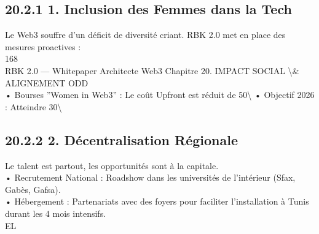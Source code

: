 \subsection{20.2.1 1. Inclusion des Femmes dans la Tech}
Le Web3 souffre d’un déficit de diversité criant. RBK 2.0 met en place des mesures proactives :\\
\vspace{0.5em}
\vspace{0.5em}
168\\
RBK 2.0 — Whitepaper Architecte Web3                                                     Chapitre 20. IMPACT SOCIAL \textbackslash{}& ALIGNEMENT ODD\\
\vspace{0.5em}
\vspace{0.5em}
• Bourses ”Women in Web3” : Le coût Upfront est réduit de 50\textbackslash{}%
\vspace{0.5em}
• Objectif 2026 : Atteindre 30\textbackslash{}%
\vspace{0.5em}
\vspace{0.5em}
\subsection{20.2.2 2. Décentralisation Régionale}
Le talent est partout, les opportunités sont à la capitale.\\
\vspace{0.5em}
• Recrutement National : Roadshow dans les universités de l’intérieur (Sfax, Gabès, Gafsa).\\
\vspace{0.5em}
• Hébergement : Partenariats avec des foyers pour faciliter l’installation à Tunis durant les 4 mois intensifs.\\
\vspace{0.5em}
\vspace{0.5em}
\vspace{0.5em}
\vspace{0.5em}
EL\\
